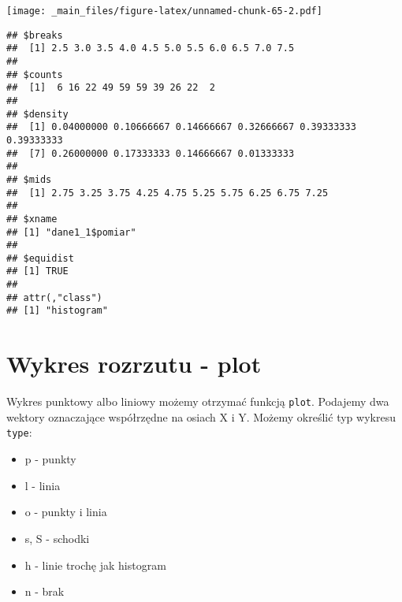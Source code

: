 \documentclass[
]{book}
\newenvironment{Shaded}{\begin{snugshade}}{\end{snugshade}}
\newcommand{\AttributeTok}[1]{\textcolor[rgb]{0.77,0.63,0.00}{#1}}
\newcommand{\CommentTok}[1]{\textcolor[rgb]{0.56,0.35,0.01}{\textit{#1}}}
\newcommand{\ConstantTok}[1]{\textcolor[rgb]{0.00,0.00,0.00}{#1}}
\newcommand{\DecValTok}[1]{\textcolor[rgb]{0.00,0.00,0.81}{#1}}
\newcommand{\FunctionTok}[1]{\textcolor[rgb]{0.00,0.00,0.00}{#1}}
\newcommand{\NormalTok}[1]{#1}
\newcommand{\SpecialCharTok}[1]{\textcolor[rgb]{0.00,0.00,0.00}{#1}}
\newcommand{\StringTok}[1]{\textcolor[rgb]{0.31,0.60,0.02}{#1}}
\begin{document}
\begin{Shaded}
\end{Shaded}

\texttt{[image: \_main\_files/figure-latex/unnamed-chunk-65-2.pdf]}

\begin{Shaded}
\end{Shaded}

\begin{verbatim}
## $breaks
##  [1] 2.5 3.0 3.5 4.0 4.5 5.0 5.5 6.0 6.5 7.0 7.5
## 
## $counts
##  [1]  6 16 22 49 59 59 39 26 22  2
## 
## $density
##  [1] 0.04000000 0.10666667 0.14666667 0.32666667 0.39333333 0.39333333
##  [7] 0.26000000 0.17333333 0.14666667 0.01333333
## 
## $mids
##  [1] 2.75 3.25 3.75 4.25 4.75 5.25 5.75 6.25 6.75 7.25
## 
## $xname
## [1] "dane1_1$pomiar"
## 
## $equidist
## [1] TRUE
## 
## attr(,"class")
## [1] "histogram"
\end{verbatim}

\hypertarget{wykres-rozrzutu---plot}{%
\section{Wykres rozrzutu - plot}\label{wykres-rozrzutu---plot}}

Wykres punktowy albo liniowy możemy otrzymać funkcją \texttt{plot}. Podajemy dwa wektory oznaczające współrzędne na osiach X i Y. Możemy określić typ wykresu \texttt{type}:

\begin{itemize}
\item
  p - punkty
\item
  l - linia
\item
  o - punkty i linia
\item
  s, S - schodki
\item
  h - linie trochę jak histogram
\item
  n - brak
\end{itemize}
\end{document}
